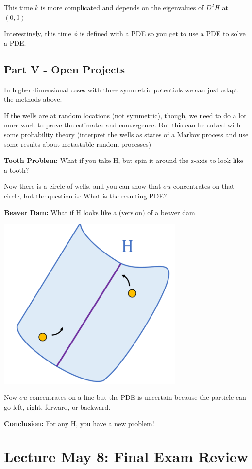 \documentclass[12pt]{article}
\begin{document}
This time $k$ is more complicated and depends on the eigenvalues of $D^2H$ at $(0, 0)$

Interestingly, this time $\phi$ is defined with a PDE so you get to use a PDE to solve a PDE. 

\subsection*{Part V - Open Projects}
In higher dimensional cases with three symmetric potentials we can just adapt the methods above. 

If the wells are at random locations (not symmetric), though, we need to do a lot more work to prove the estimates and convergence. But this can be solved with some probability theory (interpret the wells as states of a Markov process and use some results about metastable random processes)

\textbf{Tooth Problem:} What if you take H, but spin it around the z-axis to look like a tooth?

Now there is a circle of wells, and you can show that $\sigma u$ concentrates on that circle, but the question is: What is the resulting PDE?

\textbf{Beaver Dam:} What if H looks like a (version) of a beaver dam

\includegraphics[width=0.7\textwidth]{Images/beaver dam.png}

Now $\sigma u$ concentrates on a line but the PDE is uncertain because the particle can go left, right, forward, or backward.

\textbf{Conclusion:} For any H, you have a new problem! 

\section{Lecture May 8: Final Exam Review} 
\end{document}
